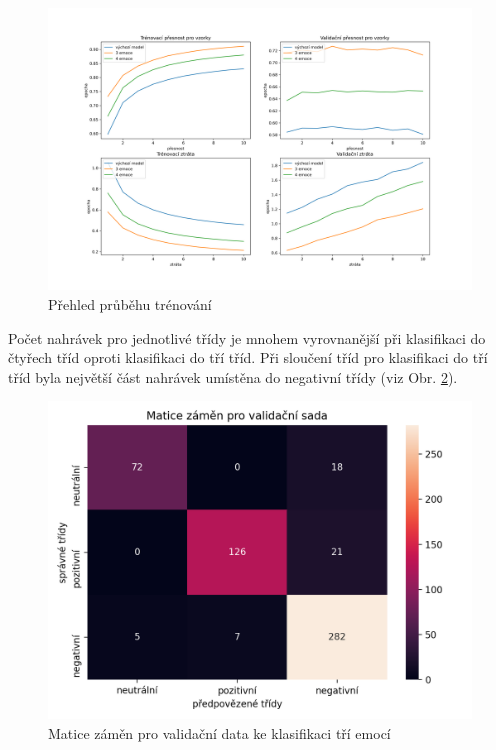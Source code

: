 \documentclass[FM,BP]{tulthesis}
\begin{document}
\begin{figure}[!htbp]
\centerline{\includegraphics[scale=.5]{training_course-emotion_reduction.png}}
\caption{Přehled průběhu trénování}
\label{fig}
\end{figure}
\FloatBarrier

Počet nahrávek pro jednotlivé třídy je mnohem vyrovnanější při klasifikaci do čtyřech tříd oproti klasifikaci do tří tříd. Při sloučení tříd pro klasifikaci do tří tříd byla největší část nahrávek umístěna do negativní třídy (viz Obr. \ref{fig:3_emotions-conf_matrix-val}). 

\begin{figure}[!htbp]
\centerline{\includegraphics[scale=.5]{3_emotions-conf_matrix-val.png}}
\caption{Matice záměn pro validační data ke klasifikaci tří emocí}
\label{fig:3_emotions-conf_matrix-val}
\end{figure}
\FloatBarrier
\end{document}
